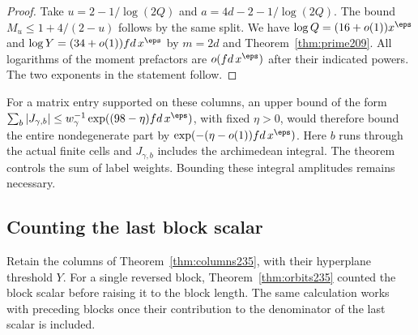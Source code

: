 \documentclass[a4paper,11pt]{article}
\theoremstyle{definition}
\theoremstyle{remark}
\numberwithin{equation}{section}
\begin{document}
\begin{proof}
Take \(u=2-1/\log(2Q)\) and \(a=4d-2-1/\log(2Q)\).
The bound \(M_u\le1+4/(2-u)\) follows by the same split.
We have \(\log Q=(16+o(1))x^\eps\) and
\(\log Y=(34+o(1))fd\,x^\eps\) by \(m=2d\) and
Theorem~\ref{thm:prime209}. All logarithms of the moment
prefactors are \(o(fd\,x^\eps)\) after their indicated powers.
The two exponents in the statement follow.
\end{proof}

For a matrix entry supported on these columns, an upper bound
of the form \(\sum_b|J_{\gamma,b}|\le
w_\gamma^{-1}\exp((98-\eta)fd\,x^\eps)\), with fixed
\(\eta>0\), would therefore bound the entire nondegenerate part
by \(\exp(-(\eta-o(1))fd\,x^\eps)\). Here \(b\) runs through
the actual finite cells and \(J_{\gamma,b}\) includes the
archimedean integral. The theorem controls the sum of label
weights. Bounding these integral amplitudes remains necessary.

\subsection{Counting the last block scalar}\label{nav:VIII-32}
Retain the columns of Theorem~\ref{thm:columns235}, with their
hyperplane threshold \(Y\). For a single reversed block,
Theorem~\ref{thm:orbits235} counted the block scalar before
raising it to the block length. The same calculation works with
preceding blocks once their contribution to the denominator of
the last scalar is included.
\end{document}
